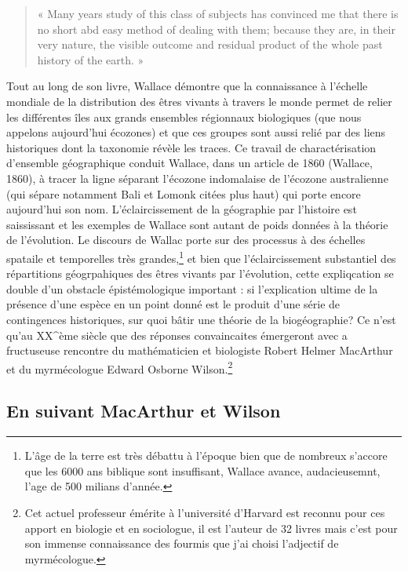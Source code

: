 \begin{quote}
« Many years study of this class of subjects has convinced me that there
is no short abd easy method of dealing with them; because they are, in
their very nature, the visible outcome and residual product of the whole
past history of the earth. »
\end{quote}

Tout au long de son livre, Wallace démontre que la connaissance à
l'échelle mondiale de la distribution des êtres vivants à travers le
monde permet de relier les différentes îles aux grands ensembles
régionnaux biologiques (que nous appelons aujourd'hui écozones) et que
ces groupes sont aussi relié par des liens historiques dont la taxonomie
révèle les traces. Ce travail de charactérisation d'ensemble
géographique conduit Wallace, dans un article de 1860 (Wallace, 1860), à
tracer la ligne séparant l'écozone indomalaise de l'écozone australienne
(qui sépare notamment Bali et Lomonk citées plus haut) qui porte encore
aujourd'hui son nom. L'éclaircissement de la géographie par l'histoire
est saississant et les exemples de Wallace sont autant de poids données
à la théorie de l'évolution. Le discours de Wallac porte sur des
processus à des échelles spataile et temporelles très grandes,\footnote{L'âge
  de la terre est très débattu à l'époque bien que de nombreux s'accore
  que les 6000 ans biblique sont insuffisant, Wallace avance,
  audacieusemnt, l'age de 500 milians d'année.} et bien que
l'éclaircissement substantiel des répartitions géogrpahiques des êtres
vivants par l'évolution, cette expliqcation se double d'un obstacle
épistémologique important : si l'explication ultime de la présence d'une
espèce en un point donné est le produit d'une série de contingences
historiques, sur quoi bâtir une théorie de la biogéographie? Ce n'est
qu'au XX\^{}ème siècle que des réponses convaincaites émergeront avec a
fructuseuse rencontre du mathématicien et biologiste Robert Helmer
MacArthur et du myrmécologue Edward Osborne Wilson.\footnote{Cet actuel
  professeur émérite à l'université d'Harvard est reconnu pour ces
  apport en biologie et en sociologue, il est l'auteur de 32 livres mais
  c'est pour son immense connaissance des fourmis que j'ai choisi
  l'adjectif de myrmécologue.}

\subsection*{En suivant MacArthur et
Wilson}\label{en-suivant-macarthur-et-wilson}

